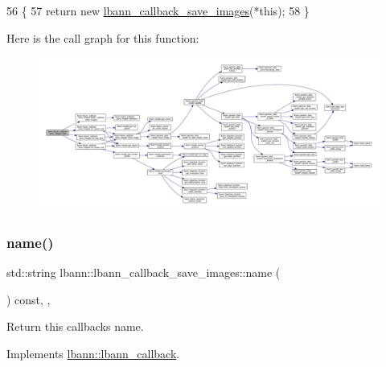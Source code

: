 \begin{DoxyCode}
56                                                     \{
57     \textcolor{keywordflow}{return} \textcolor{keyword}{new} \hyperlink{classlbann_1_1lbann__callback__save__images_a19825aa8f1bc28114a5269bee6c88758}{lbann\_callback\_save\_images}(*\textcolor{keyword}{this});
58   \}
\end{DoxyCode}
Here is the call graph for this function\+:\nopagebreak
\begin{figure}[H]
\begin{center}
\leavevmode
\includegraphics[width=350pt]{classlbann_1_1lbann__callback__save__images_a6abba6b6a94080c09f52f1aac8773461_cgraph}
\end{center}
\end{figure}
\mbox{\label{classlbann_1_1lbann__callback__save__images_ae3e0f20308b83a3a1b2fe0ba1acbd072}} 
\subsubsection{\texorpdfstring{name()}{name()}}
{\footnotesize\ttfamily std\+::string lbann\+::lbann\+\_\+callback\+\_\+save\+\_\+images\+::name (\begin{DoxyParamCaption}{ }\end{DoxyParamCaption}) const\hspace{0.3cm}{\ttfamily [inline]}, {\ttfamily [override]}, {\ttfamily [virtual]}}

Return this callback\textquotesingle{}s name. 

Implements \hyperlink{classlbann_1_1lbann__callback_a7522c7a14f1d6a1ea762cc2d7248eb3a}{lbann\+::lbann\+\_\+callback}.




